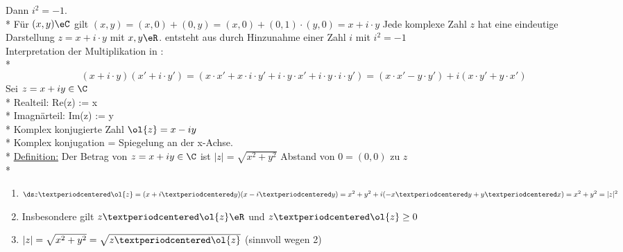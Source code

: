 Dann $i^2=-1$.\\*
Für $(x,y)\eC$ gilt $(x,y)=(x,0)+(0,y)=(x,0)+(0,1)·(y,0)=x+i·y$
Jede komplexe Zahl $z$ hat eine eindeutige Darstellung $z=x+i·y$ mit $x,y\eR$.
\C{} entsteht aus \R{} durch Hinzunahme einer Zahl $i$ mit $i^2=-1$\\
Interpretation der Multiplikation in \C:\\*
$$(x+i·y)(x'+i·y')=(x·x'+x·i·y'+i·y·x'+i·y·i·y')=(x·x'-y·y')+i(x·y'+y·x')$$
Sei $z = x + iy \in \C$\\*
Realteil: Re(z) := x \\*
Imagnärteil: Im(z) := y\\*
Komplex konjugierte Zahl $\ol{z} = x - iy$\\*
Komplex konjugation = Spiegelung an der x-Achse.\\*
\ul{Definition:} Der Betrag von $z = x + iy \in \C$ ist $|z| = \sqrt{x^2 + y^2}$ Abstand von $0 = (0, 0)$ zu $z$\\*
\bem
\begin{enumerate}
\item{$\ds z·\ol{z}=(x+i·y)(x-i·y)=x^2+y^2+i(-x·y+y·x)=x^2+y^2=|z|^2$}
\item{Insbesondere gilt $z·\ol{z}\eR$ und $z·\ol{z}\geq 0$}
\item{$|z|=\sqrt{x^2+y^2}=\sqrt{z·\ol{z}}$ (sinnvoll wegen 2)}
\end{enumerate}